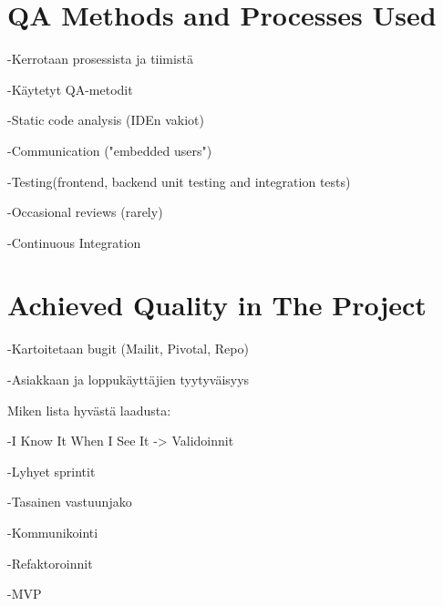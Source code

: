
 \section{QA Methods and Processes Used}

-Kerrotaan prosessista ja tiimistä 
 
-Käytetyt QA-metodit

	-Static code analysis (IDEn vakiot)

	-Communication ("embedded users")

	-Testing(frontend, backend unit testing and integration tests)

	-Occasional reviews (rarely)

	-Continuous Integration


 \section{Achieved Quality in The Project}

-Kartoitetaan bugit (Mailit, Pivotal, Repo)  

-Asiakkaan ja loppukäyttäjien tyytyväisyys


Miken lista hyvästä laadusta:

-I Know It When I See It -> Validoinnit

-Lyhyet sprintit

-Tasainen vastuunjako

-Kommunikointi

-Refaktoroinnit

-MVP
